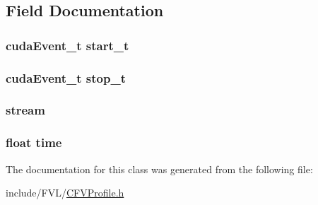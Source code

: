 \subsection{Field Documentation}
\hypertarget{classFVL_1_1CFVProfile_a1e3f4a6461ec09e22b9a53be916a99da}{
\subsubsection[{start\_\-t}]{\setlength{\rightskip}{0pt plus 5cm}cudaEvent\_\-t {\bf start\_\-t}}}
\label{d4/d21/classFVL_1_1CFVProfile_a1e3f4a6461ec09e22b9a53be916a99da}
\hypertarget{classFVL_1_1CFVProfile_af43943dcc9c2ea9f3617901c89566b4b}{
\subsubsection[{stop\_\-t}]{\setlength{\rightskip}{0pt plus 5cm}cudaEvent\_\-t {\bf stop\_\-t}}}
\label{d4/d21/classFVL_1_1CFVProfile_af43943dcc9c2ea9f3617901c89566b4b}
\hypertarget{classFVL_1_1CFVProfile_a0be27d2b6072a83dbea8a4e16b22495f}{
\subsubsection[{stream}]{ {\bf stream}}}
\label{d4/d21/classFVL_1_1CFVProfile_a0be27d2b6072a83dbea8a4e16b22495f}
\hypertarget{classFVL_1_1CFVProfile_a8b8dfe2335a5bf90695960dc6a1c5d3b}{
\subsubsection[{time}]{\setlength{\rightskip}{0pt plus 5cm}float {\bf time}}}
\label{d4/d21/classFVL_1_1CFVProfile_a8b8dfe2335a5bf90695960dc6a1c5d3b}


The documentation for this class was generated from the following file:\begin{DoxyCompactItemize}
\item 
include/FVL/\hyperlink{CFVProfile_8h}{CFVProfile.h}\end{DoxyCompactItemize}

